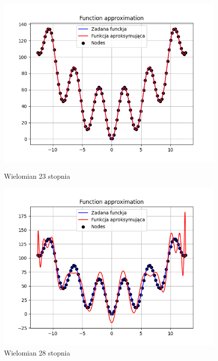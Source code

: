 \documentclass{article}
\begin{document}
\begin{figure}[H]
  \begin{minipage}[b]{0.49\textwidth}
    \begin{minipage}[b]{\textwidth}
      \includegraphics[width=\textwidth]{img23.png}
      \caption{Wielomian 23 stopnia}
    \end{minipage}
    \vspace*{\fill}
    \begin{minipage}[b]{\textwidth}
      \includegraphics[width=\textwidth]{img24.png}
      \caption{Wielomian 28 stopnia}
    \end{minipage}
  \end{minipage}
  \hfill
  \begin{minipage}[b]{0.49\textwidth}

\end{minipage}
\end{figure}
\end{document}
